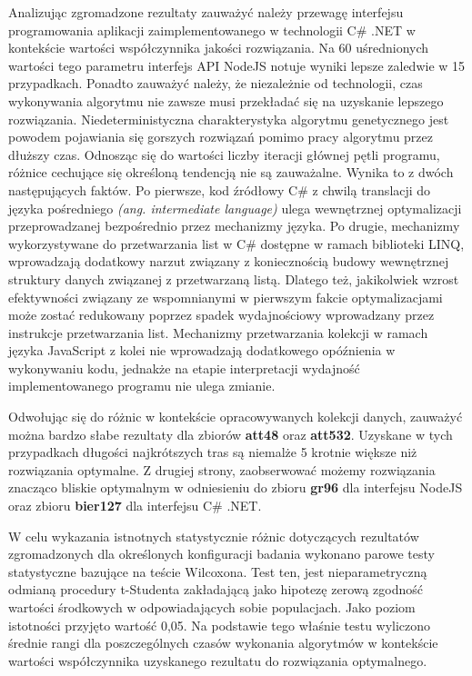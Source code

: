 Analizując zgromadzone rezultaty zauważyć należy przewagę interfejsu programowania aplikacji zaimplementowanego w technologii C\# .NET w kontekście wartości współczynnika jakości rozwiązania. Na 60 uśrednionych wartości tego parametru interfejs API NodeJS notuje wyniki lepsze zaledwie w 15 przypadkach. Ponadto zauważyć należy, że niezależnie od technologii, czas wykonywania algorytmu nie zawsze musi przekładać się na uzyskanie lepszego rozwiązania. Niedeterministyczna charakterystyka algorytmu genetycznego jest powodem pojawiania się gorszych rozwiązań pomimo pracy algorytmu przez dłuższy czas. Odnosząc się do wartości liczby iteracji głównej pętli programu, różnice cechujące się określoną tendencją nie są zauważalne. Wynika to z dwóch następujących faktów. Po pierwsze, kod źródłowy C\# z chwilą translacji do języka pośredniego \textit{(ang. intermediate language)} ulega wewnętrznej optymalizacji przeprowadzanej bezpośrednio przez mechanizmy języka. Po drugie, mechanizmy wykorzystywane do przetwarzania list w C\# dostępne w ramach biblioteki LINQ, wprowadzają dodatkowy narzut związany z koniecznością budowy wewnętrznej struktury danych związanej z przetwarzaną listą. Dlatego też, jakikolwiek wzrost efektywności związany ze wspomnianymi w pierwszym fakcie optymalizacjami może zostać redukowany poprzez spadek wydajnościowy wprowadzany przez instrukcje przetwarzania list. Mechanizmy przetwarzania kolekcji w ramach języka JavaScript z kolei nie wprowadzają dodatkowego opóźnienia w wykonywaniu kodu, jednakże na etapie interpretacji wydajność implementowanego programu nie ulega zmianie.

Odwołując się do różnic w kontekście opracowywanych kolekcji danych, zauważyć można bardzo słabe rezultaty dla zbiorów \textbf{att48} oraz \textbf{att532}. Uzyskane w tych przypadkach długości najkrótszych tras są niemalże 5 krotnie większe niż rozwiązania optymalne. Z drugiej strony, zaobserwować możemy rozwiązania znacząco bliskie optymalnym w odniesieniu do zbioru \textbf{gr96} dla interfejsu NodeJS oraz zbioru \textbf{bier127} dla interfejsu C\# .NET.

W celu wykazania istnotnych statystycznie różnic dotyczących rezultatów zgromadzonych dla określonych konfiguracji badania wykonano parowe testy statystyczne bazujące na teście Wilcoxona. Test ten, jest nieparametryczną odmianą procedury t-Studenta zakładającą jako hipotezę zerową zgodność wartości środkowych w odpowiadających sobie populacjach. Jako poziom istotności przyjęto wartość 0,05. Na podstawie tego właśnie testu wyliczono średnie rangi dla poszczególnych czasów wykonania algorytmów w kontekście wartości współczynnika uzyskanego rezultatu do rozwiązania optymalnego.

